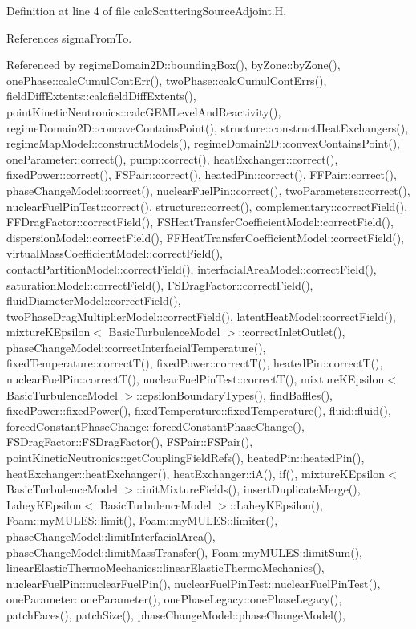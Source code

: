 Definition at line 4 of file calc\+Scattering\+Source\+Adjoint.\+H.



References sigma\+From\+To.



Referenced by regime\+Domain2\+D\+::bounding\+Box(), by\+Zone\+::by\+Zone(), one\+Phase\+::calc\+Cumul\+Cont\+Err(), two\+Phase\+::calc\+Cumul\+Cont\+Errs(), field\+Diff\+Extents\+::calcfield\+Diff\+Extents(), point\+Kinetic\+Neutronics\+::calc\+G\+E\+M\+Level\+And\+Reactivity(), regime\+Domain2\+D\+::concave\+Contains\+Point(), structure\+::construct\+Heat\+Exchangers(), regime\+Map\+Model\+::construct\+Models(), regime\+Domain2\+D\+::convex\+Contains\+Point(), one\+Parameter\+::correct(), pump\+::correct(), heat\+Exchanger\+::correct(), fixed\+Power\+::correct(), F\+S\+Pair\+::correct(), heated\+Pin\+::correct(), F\+F\+Pair\+::correct(), phase\+Change\+Model\+::correct(), nuclear\+Fuel\+Pin\+::correct(), two\+Parameters\+::correct(), nuclear\+Fuel\+Pin\+Test\+::correct(), structure\+::correct(), complementary\+::correct\+Field(), F\+F\+Drag\+Factor\+::correct\+Field(), F\+S\+Heat\+Transfer\+Coefficient\+Model\+::correct\+Field(), dispersion\+Model\+::correct\+Field(), F\+F\+Heat\+Transfer\+Coefficient\+Model\+::correct\+Field(), virtual\+Mass\+Coefficient\+Model\+::correct\+Field(), contact\+Partition\+Model\+::correct\+Field(), interfacial\+Area\+Model\+::correct\+Field(), saturation\+Model\+::correct\+Field(), F\+S\+Drag\+Factor\+::correct\+Field(), fluid\+Diameter\+Model\+::correct\+Field(), two\+Phase\+Drag\+Multiplier\+Model\+::correct\+Field(), latent\+Heat\+Model\+::correct\+Field(), mixture\+K\+Epsilon$<$ Basic\+Turbulence\+Model $>$\+::correct\+Inlet\+Outlet(), phase\+Change\+Model\+::correct\+Interfacial\+Temperature(), fixed\+Temperature\+::correct\+T(), fixed\+Power\+::correct\+T(), heated\+Pin\+::correct\+T(), nuclear\+Fuel\+Pin\+::correct\+T(), nuclear\+Fuel\+Pin\+Test\+::correct\+T(), mixture\+K\+Epsilon$<$ Basic\+Turbulence\+Model $>$\+::epsilon\+Boundary\+Types(), find\+Baffles(), fixed\+Power\+::fixed\+Power(), fixed\+Temperature\+::fixed\+Temperature(), fluid\+::fluid(), forced\+Constant\+Phase\+Change\+::forced\+Constant\+Phase\+Change(), F\+S\+Drag\+Factor\+::\+F\+S\+Drag\+Factor(), F\+S\+Pair\+::\+F\+S\+Pair(), point\+Kinetic\+Neutronics\+::get\+Coupling\+Field\+Refs(), heated\+Pin\+::heated\+Pin(), heat\+Exchanger\+::heat\+Exchanger(), heat\+Exchanger\+::i\+A(), if(), mixture\+K\+Epsilon$<$ Basic\+Turbulence\+Model $>$\+::init\+Mixture\+Fields(), insert\+Duplicate\+Merge(), Lahey\+K\+Epsilon$<$ Basic\+Turbulence\+Model $>$\+::\+Lahey\+K\+Epsilon(), Foam\+::my\+M\+U\+L\+E\+S\+::limit(), Foam\+::my\+M\+U\+L\+E\+S\+::limiter(), phase\+Change\+Model\+::limit\+Interfacial\+Area(), phase\+Change\+Model\+::limit\+Mass\+Transfer(), Foam\+::my\+M\+U\+L\+E\+S\+::limit\+Sum(), linear\+Elastic\+Thermo\+Mechanics\+::linear\+Elastic\+Thermo\+Mechanics(), nuclear\+Fuel\+Pin\+::nuclear\+Fuel\+Pin(), nuclear\+Fuel\+Pin\+Test\+::nuclear\+Fuel\+Pin\+Test(), one\+Parameter\+::one\+Parameter(), one\+Phase\+Legacy\+::one\+Phase\+Legacy(), patch\+Faces(), patch\+Size(), phase\+Change\+Model\+::phase\+Change\+Model(), 